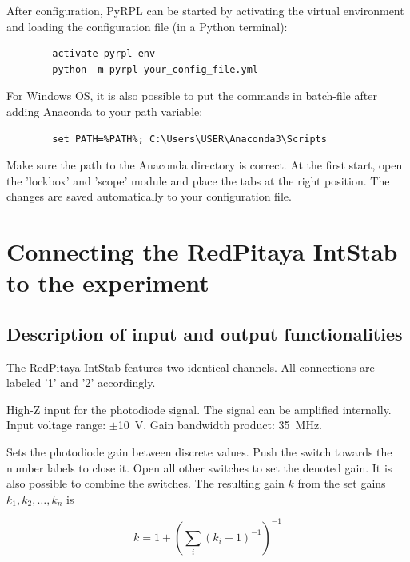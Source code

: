 \documentclass[twoside,a4paper]{refart}
\begin{document}
After configuration, PyRPL can be started by activating the virtual environment and loading the configuration file (in a Python terminal):

\begin{tcolorbox}
	\begin{verbatim}
		activate pyrpl-env
		python -m pyrpl your_config_file.yml
	\end{verbatim}
\end{tcolorbox}

For Windows OS, it is also possible to put the commands in batch-file after adding Anaconda to your path variable:

\begin{tcolorbox}
	\begin{verbatim}
		set PATH=%PATH%; C:\Users\USER\Anaconda3\Scripts
	\end{verbatim}
\end{tcolorbox}

Make sure the path to the Anaconda directory is correct. At the first start, open the 'lockbox' and 'scope' module and place the tabs at the right position. The changes are saved automatically to your configuration file.

\section{Connecting the RedPitaya IntStab to the experiment}

\subsection{Description of input and output functionalities}
The RedPitaya IntStab features two identical channels. All connections are labeled '1' and '2' accordingly. 

High-Z input for the photodiode signal. The signal can be amplified internally. Input voltage range:  $\pm$\SI{10}{\volt}. Gain bandwidth product: \SI{35}{\mega\hertz}.


Sets the photodiode gain between discrete values. Push the switch towards the number labels to close it. Open all other switches to set the denoted gain. It is also possible to combine the switches. The resulting gain $k$ from the set gains $k_1, k_2, \dots, k_n$ is


	$$k = 1+ \left(\sum_i(k_i -1)^{-1}\right)^{-1}$$
	
\end{document}

